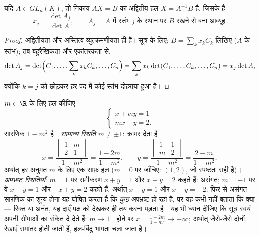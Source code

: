 \begin{theorem}[वर्ग क्रामर निकाय]\label{thm:b1:det:cramer}
यदि $A \in GL_n(K)$, तो निकाय $AX = B$ का अद्वितीय हल $X = A^{-1}B$ है,
जिसके  हैं
\[
x_j = \frac{\det A_j}{\det A},
\qquad A_j = A \text{ में स्तंभ } j \text{ के स्थान पर } B
\text{ रखने से बना आव्यूह} .
\]
\end{theorem}

\begin{proof}
अद्वितीयता और अस्तित्व व्युत्क्रमणीयता ही हैं। सूत्र के लिए: $B = \sum_k x_k
C_k$ लिखिए ($A$ के स्तंभ); तब बहुरैखिकता और एकांतरकता से,
\[
\det A_j = \det\Bigl(C_1, \dots, \sum_k x_k C_k, \dots, C_n\Bigr)
= \sum_k x_k \det(C_1, \dots, C_k, \dots, C_n)
= x_j \det A ,
\]
क्योंकि $k = j$ को छोड़कर हर पद में कोई स्तंभ दोहराया हुआ है।
\end{proof}

\begin{example}[प्राचल के साथ क्रामर, पूरा]
\label{ex:b1:det:cramerparameter}
$m \in \R$ के लिए हल कीजिए
\[
\begin{cases}
x + m y = 1\\
m x + y = 2 .
\end{cases}
\]
सारणिक $1 - m^2$ है। \emph{सामान्य स्थिति} $m \neq \pm1$: क्रामर देता है
\[
x = \frac{\begin{vmatrix} 1 & m\\ 2 & 1\end{vmatrix}}{1 - m^2}
= \frac{1 - 2m}{1 - m^2},
\qquad
y = \frac{\begin{vmatrix} 1 & 1\\ m & 2\end{vmatrix}}{1 - m^2}
= \frac{2 - m}{1 - m^2},
\]
अर्थात् हर अनुमत $m$ के लिए एक साफ़ हल ($m = 0$ पर जाँचिए: $(1, 2)$, जो
स्पष्टतः सही है)। \emph{अपभ्रष्ट स्थितियाँ}: $m = 1$ पर समीकरण $x + y = 1$
और $x + y = 2$ कहते हैं: असंगत; $m = -1$ पर वे $x - y = 1$ और $-x + y = 2$
कहते हैं, अर्थात् $x - y = 1$ और $x - y = -2$: फिर से असंगत। सारणिक का शून्य
होना यह घोषित करता है कि \emph{कुछ} अपभ्रष्ट हो रहा है, पर यह कभी नहीं बताता
कि क्या --- रिक्त या अनंत, यह दाएँ पक्ष को देखकर ही तय करना पड़ता है। यह भी
ध्यान दीजिए कि सूत्र स्वयं अपनी सीमाओं का संकेत दे देते हैं: $m \to 1^{-}$
होने पर $x = \frac{1 - 2m}{1 - m^2} \to -\infty$; अर्थात् जैसे-जैसे दोनों
रेखाएँ समांतर होती जाती हैं, हल-बिंदु भागता चला जाता है।
\end{example}

